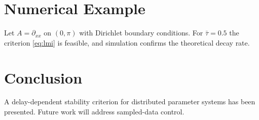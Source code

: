 \documentclass[journal,11pt]{IEEEtran}
\begin{document}
\section{Numerical Example}
Let $A=\partial_{xx}$ on $(0,\pi)$ with Dirichlet boundary conditions.
For $\bar\tau=0.5$ the criterion \eqref{eq:lmi} is feasible, and
simulation confirms the theoretical decay rate.

\section{Conclusion}
A delay-dependent stability criterion for distributed parameter systems
has been presented. Future work will address sampled-data control.
\end{document}
